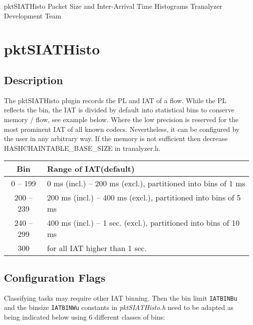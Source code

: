 \documentclass[documentation]{subfiles}
\begin{document}
\trantitle
    {pktSIATHisto}
    {Packet Size and Inter-Arrival Time Histograms}
    {Tranalyzer Development Team} %

\section{pktSIATHisto}\label{s:pktSIATHisto}

\subsection{Description}
The pktSIATHisto plugin records the PL and IAT of a flow. While the PL reflects the bin, the IAT is divided by default into statistical bins
to conserve memory / flow, see example below. Where the low precision is reserved for the most prominent IAT of all known codecs. Nevertheless, it can be configured
by the user in any arbitrary way. If the memory is not sufficient then decrease HASHCHAINTABLE\_BASE\_SIZE in tranalyzer.h.
\begin{center}
    \begin{tabular}{cl}
        \toprule
        {\bf Bin} & {\bf Range of IAT(default)} \\
        \midrule
        0 -- 199 & 0 ms (incl.) -- 200 ms (excl.), partitioned into bins of 1 ms \\
        200 -- 239 & 200 ms (incl.) -- 400 ms (excl.), partitioned into bins of 5 ms \\
        240 -- 299 & 400 ms (incl.) -- 1 sec. (excl.), partitioned into bins of 10 ms \\
        300 & for all IAT higher than 1 sec. \\
        \bottomrule
    \end{tabular}
\end{center}

\subsection{Configuration Flags}

Classifying tasks may require other IAT binning. Then the bin limit {\tt IATBINBu} and the binsize {\tt IATBINWu} constants in {\em pktSIATHisto.h} need to be adapted as being indicated below using 6 different classes of bins:
\end{document}

